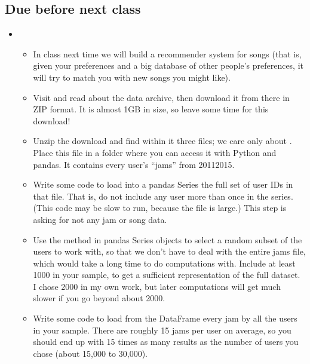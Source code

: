 \documentclass[letterpaper,10pt,english]{jupyterBook}
\begin{document}
\subsection{Due before next class}
\label{\detokenize{course-schedule:id18}}\begin{itemize}
\item {} 
\sphinxAtStartPar
{}
\begin{itemize}
\item {} 
\sphinxAtStartPar
In class next time we will build a recommender system for songs (that is, given your preferences and a big database of other people’s preferences, it will try to match you with new songs you might like).

\item {} 
\sphinxAtStartPar
Visit  and read about the data archive, then download it from there in ZIP format.  It is almost 1GB in size, so leave some time for this download!

\item {} 
\sphinxAtStartPar
Unzip the download and find within it three files; we care only about .  Place this file in a folder where you can access it with Python and pandas.  It contains every user’s “jams” from 2011\sphinxhyphen{}2015.

\item {} 
\sphinxAtStartPar
Write some code to load into a pandas Series the full set of  user IDs in that file.  That is, do not include any user more than once in the series.  (This code may be slow to run, because the file is large.)  This step is asking for  not any jam or song data.

\item {} 
\sphinxAtStartPar
Use the  method in pandas Series objects to select a random subset of the users to work with, so that we don’t have to deal with the entire jams file, which would take a long time to do computations with.  Include at least 1000 in your sample, to get a sufficient representation of the full dataset.  I chose 2000 in my own work, but later computations will get much slower if you go beyond about 2000.

\item {} 
\sphinxAtStartPar
Write some code to load from the  DataFrame every jam by all the users in your sample.  There are roughly 15 jams per user on average, so you should end up with 15 times as many results as the number of users you chose (about 15,000 to 30,000).


\end{itemize}
\end{itemize}
\end{document}
